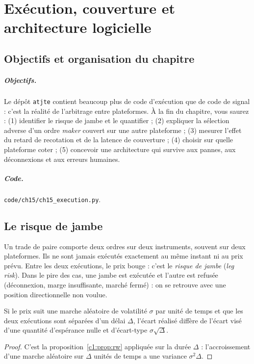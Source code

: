 \chapter{Exécution, couverture et architecture logicielle}
\label{ch:15}

\section{Objectifs et organisation du chapitre}

\paragraph{Objectifs.} Le dépôt \texttt{atjte} contient beaucoup plus de code d'exécution que de code de signal : c'est la réalité de l'arbitrage entre plateformes. À la fin du chapitre, vous saurez : (1) identifier le risque de jambe et le quantifier ; (2) expliquer la sélection adverse d'un ordre \emph{maker} couvert sur une autre plateforme ; (3) mesurer l'effet du retard de recotation et de la latence de couverture ; (4) choisir sur quelle plateforme coter ; (5) concevoir une architecture qui survive aux pannes, aux déconnexions et aux erreurs humaines.

\paragraph{Code.} \texttt{code/ch15/ch15\_execution.py}.

\section{Le risque de jambe}

Un trade de paire comporte deux ordres sur deux instruments, souvent sur deux plateformes. Ils ne sont jamais exécutés exactement au même instant ni au prix prévu. Entre les deux exécutions, le prix bouge : c'est le \emph{risque de jambe} (\emph{leg risk}). Dans le pire des cas, une jambe est exécutée et l'autre est refusée (déconnexion, marge insuffisante, marché fermé) : on se retrouve avec une position directionnelle non voulue.

\begin{proposition}\label{c15:prop:leg}
Si le prix suit une marche aléatoire de volatilité $\sigma$ par unité de temps et que les deux exécutions sont séparées d'un délai $\Delta$, l'écart réalisé diffère de l'écart visé d'une quantité d'espérance nulle et d'écart-type $\sigma\sqrt\Delta$.
\end{proposition}
\begin{proof}
C'est la proposition~\ref{c1:prop:rw} appliquée sur la durée $\Delta$ : l'accroissement d'une marche aléatoire sur $\Delta$ unités de temps a une variance $\sigma^2\Delta$.
\end{proof}

